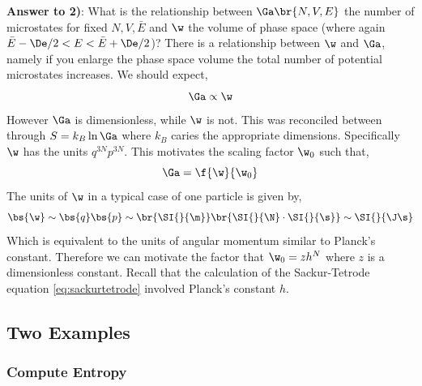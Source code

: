 \documentclass{article}
\begin{document}
\textbf{Answer to 2)}:
What is the relationship between $\Ga\br{N,V,E}$ the number of microstates for fixed $N, V, \bar{E}$ and $\w$ the volume of phase space (where again $\bar{E} - \De / 2 < E < \bar{E} + \De / 2$)? There is a relationship between $\w$ and $\Ga$, namely if you enlarge the phase space volume the total number of potential microstates increases. We should expect,
\[ \Ga \propto \w \]
However $\Ga$ is dimensionless, while $\w$ is not. This was reconciled between through $S = k_B \ln \Ga$ where $k_B$ caries the appropriate dimensions. Specifically $\w$ has the units $q^{3N}p^{3N}$. This motivates the scaling factor $\w_0$ such that,
\[ \Ga = \f{\w}{\w_0} \]
The units of $\w$ in a typical case of one particle is given by,
\[ \bs{\w} \sim \bs{q}\bs{p} \sim \br{\SI{}{\m}}\br{\SI{}{\N}\cdot \SI{}{\s}} \sim \SI{}{\J\s} \]
Which is equivalent to the units of angular momentum similar to Planck's constant. Therefore we can motivate the factor that $\w_0 = z h^N$ where $z$ is a dimensionless constant. Recall that the calculation of the Sackur-Tetrode equation \eqref{eq:sackurtetrode} involved Planck's constant $h$.

\subsection{Two Examples}
\subsubsection{Compute Entropy}
\end{document}

